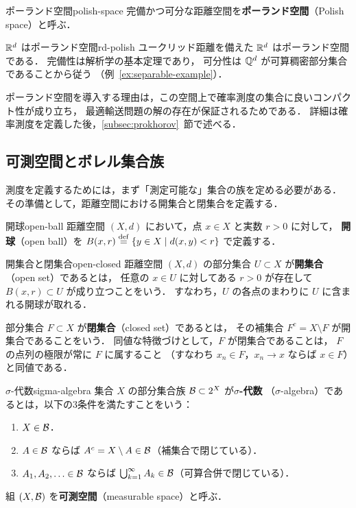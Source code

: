 \begin{definition}{ポーランド空間}{polish-space}
  完備かつ可分な距離空間を\textbf{ポーランド空間}（Polish space）と呼ぶ．
\end{definition}

\begin{example}{$\mathbb{R}^d$ はポーランド空間}{rd-polish}
  ユークリッド距離を備えた $\mathbb{R}^d$ はポーランド空間である．
  完備性は解析学の基本定理であり，
  可分性は $\mathbb{Q}^d$ が可算稠密部分集合であることから従う
  （例~\ref{ex:separable-example}）．
\end{example}

ポーランド空間を導入する理由は，この空間上で確率測度の集合に良いコンパクト性が成り立ち，
最適輸送問題の解の存在が保証されるためである．
詳細は確率測度を定義した後，\ref{subsec:prokhorov}~節で述べる．

\subsection{可測空間とボレル集合族}
\label{subsec:measurable-space}

測度を定義するためには，まず「測定可能な」集合の族を定める必要がある．
その準備として，距離空間における開集合と閉集合を定義する．

\begin{definition}{開球}{open-ball}
  距離空間 $(X, d)$ において，点 $x \in X$ と実数 $r > 0$ に対して，
  \textbf{開球}（open ball）を
  $B(x, r) \overset{\mathrm{def}}{=} \{y \in X \mid d(x, y) < r\}$
  で定義する．
\end{definition}

\begin{definition}{開集合と閉集合}{open-closed}
  距離空間 $(X, d)$ の部分集合 $U \subset X$ が\textbf{開集合}（open set）であるとは，
  任意の $x \in U$ に対してある $r > 0$ が存在して
  $B(x, r) \subset U$ が成り立つことをいう．
  すなわち，$U$ の各点のまわりに $U$ に含まれる開球が取れる．

  部分集合 $F \subset X$ が\textbf{閉集合}（closed set）であるとは，
  その補集合 $F^c = X \setminus F$ が開集合であることをいう．
  同値な特徴づけとして，$F$ が閉集合であることは，
  $F$ の点列の極限が常に $F$ に属すること
  （すなわち $x_n \in F$，$x_n \to x$ ならば $x \in F$）と同値である．
\end{definition}

\begin{definition}{$\sigma$-代数}{sigma-algebra}
  集合 $X$ の部分集合族 $\mathcal{B} \subset 2^X$ が\textbf{$\sigma$-代数}
  （$\sigma$-algebra）であるとは，以下の3条件を満たすことをいう：
  \begin{enumerate}
    \item $X \in \mathcal{B}$．
    \item $A \in \mathcal{B}$ ならば $A^c = X \setminus A \in \mathcal{B}$（補集合で閉じている）．
    \item $A_1, A_2, \ldots \in \mathcal{B}$ ならば
      $\bigcup_{k=1}^{\infty} A_k \in \mathcal{B}$（可算合併で閉じている）．
  \end{enumerate}
  組 $(X, \mathcal{B})$ を\textbf{可測空間}（measurable space）と呼ぶ．
\end{definition}

